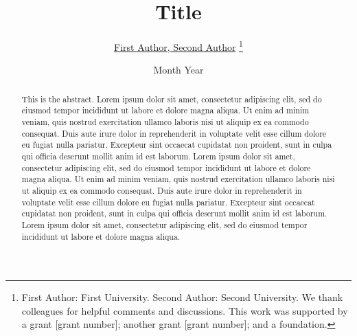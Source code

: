 \documentclass[12pt,twoside]{article}
\begin{document}



\begin{spacing}{0.9}
\begin{titlepage}

\title{Title}

\author{\large \href{https://sites.google.com/view/jaeyungkim}{First Author, Second Author}
\thanks{First Author: First University. Second Author: Second University. We thank colleagues for helpful comments and discussions. This work was supported by a grant [grant number]; another grant [grant number]; and a foundation.}}

\date{\large Month Year}
\maketitle
\thispagestyle{empty}

\vspace{-0.3in}

\begin{abstract}
This is the abstract. Lorem ipsum dolor sit amet, consectetur adipiscing elit, sed do
eiusmod tempor incididunt ut labore et dolore magna aliqua. Ut enim ad minim veniam,
quis nostrud exercitation ullamco laboris nisi ut aliquip ex ea commodo consequat. Duis
aute irure dolor in reprehenderit in voluptate velit esse cillum dolore eu fugiat nulla
pariatur. Excepteur sint occaecat cupidatat non proident, sunt in culpa qui officia deserunt
mollit anim id est laborum. Lorem ipsum dolor sit amet, consectetur adipiscing elit, sed do
eiusmod tempor incididunt ut labore et dolore magna aliqua. Ut enim ad minim veniam,
quis nostrud exercitation ullamco laboris nisi ut aliquip ex ea commodo consequat. Duis
aute irure dolor in reprehenderit in voluptate velit esse cillum dolore eu fugiat nulla
pariatur. Excepteur sint occaecat cupidatat non proident, sunt in culpa qui officia deserunt
mollit anim id est laborum. Lorem ipsum dolor sit amet, consectetur adipiscing elit, sed
do eiusmod tempor incididunt ut labore et dolore magna aliqua.
\end{abstract}

\end{titlepage}
\end{spacing}
\end{document}
